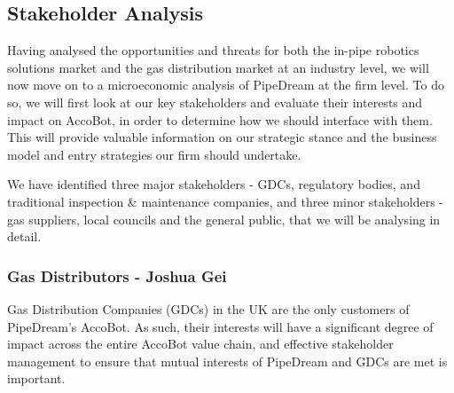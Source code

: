 \documentclass[11pt]{article}		%
\begin{document}
	\subsection{Stakeholder Analysis}

		Having analysed the opportunities and threats for both the in-pipe robotics solutions market and the gas distribution market at an industry level, we will now move on to a microeconomic analysis of PipeDream at the firm level. To do so, we will first look at our key stakeholders and evaluate their interests and impact on AccoBot, in order to determine how we should interface with them. This will provide valuable information on our strategic stance and the business model and entry strategies our firm should undertake.
		
		We have identified three major stakeholders - GDCs, regulatory bodies, and traditional inspection \& maintenance companies, and three minor stakeholders - gas suppliers, local councils and the general public, that we will be analysing in detail. 
		
		
		
		\subsubsection[Gas Distributors]{Gas Distributors - Joshua Gei} \label{GDCstakeholders}
	
		Gas Distribution Companies (GDCs) in the UK are the only customers of PipeDream’s AccoBot. As such, their interests will have a significant degree of impact across the entire AccoBot value chain, and effective stakeholder management to ensure that mutual interests of PipeDream and GDCs are met is important. 
	
\end{document}

